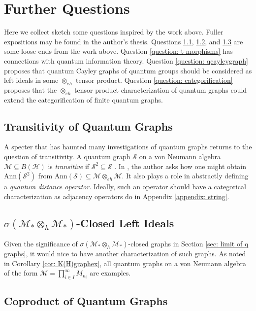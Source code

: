 \documentclass[12pt]{article}
\theoremstyle{definition}
\newcommand{\mc}[1]{\mathcal{#1}}
\newcommand{\<}{\langle}
\renewcommand{\>}{\rangle}
\newcommand{\Ann}{\text{Ann}}
\renewcommand{\subset}{\subseteq}
\newcommand{\eh}{\otimes_{eh}}
\newcommand{\h}{\otimes_{h}}
\begin{document}
\section{Further Questions} \label{sec: questions}

Here we collect sketch some questions inspired by the work above. Fuller expositions may be found in the author's thesis. Questions \ref{question: transitivity}, \ref{question: left ideals}, and \ref{question: coproduct} are some loose ends from the work above. Question \ref{question: t-morphisms} has connections with quantum information theory. Question \ref{question: qcayleygraph} proposes that quantum Cayley graphs of quantum groups should be considered as left ideals in some $\eh$ tensor product. Question \ref{question: categorification} proposes that the $\eh$ tensor product characterization of quantum graphs could extend the categorification of finite quantum graphs.

\subsection{Transitivity of Quantum Graphs} \label{question: transitivity}

A specter that has haunted many investigations of quantum graphs returns to the question of transitivity. A quantum graph $\mc S$ on a von Neumann algebra $\mc M \subset B(\mc H)$ is \textit{transitive} if $\mc S^2 \subset \mc S$ \cite[Definition 2.4]{weaverqrelations}. In \cite[Remark 3.4(iii)]{gp-obs}, the author asks how one might obtain $\Ann(\mc S^2)$ from $\Ann(\mc S) \subset \mc M \eh \mc M$. It also plays a role in abstractly defining a \textit{quantum distance operator}. Ideally, such an operator should have a categorical characterization as adjacency operators do in Appendix \ref{appendix: string}.

\subsection{\texorpdfstring{$\sigma(\mc M_* \h \mc M_*)$}{}-Closed Left Ideals} \label{question: left ideals}

Given the significance of $\sigma(\mc M_* \h \mc M_*)$-closed graphs in Section \ref{sec: limit of q graphs}, it would nice to have another characterization of such graphs. As noted in Corollary \ref{cor: K(H)graphex}, all quantum graphs on a von Neumann algebra of the form $\mc M = \prod_{i \in I}^\infty M_{n_i}$ are examples.

\subsection{Coproduct of Quantum Graphs} \label{question: coproduct}
\end{document}
